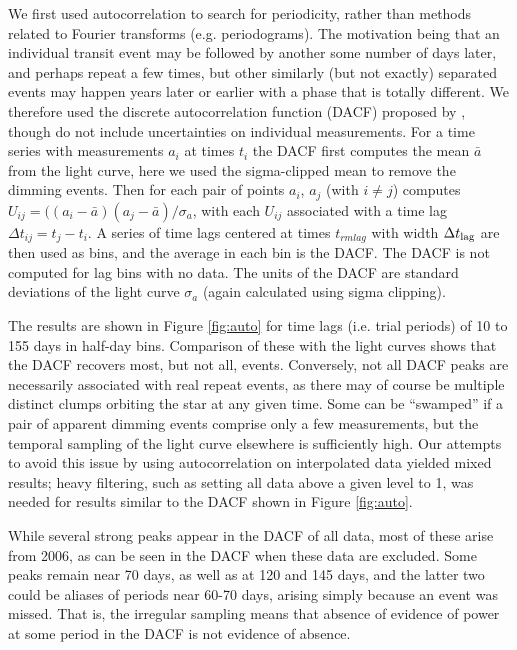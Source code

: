 \documentclass[useAMS,usenatbib,usegraphicx]{mn2e}
\begin{document}
We first used autocorrelation to search for periodicity, rather than methods related to
Fourier transforms (e.g. periodograms). The motivation being that an individual transit
event may be followed by another some number of days later, and perhaps repeat a few
times, but other similarly (but not exactly) separated events may happen years later or
earlier with a phase that is totally different. We therefore used the discrete
autocorrelation function (DACF) proposed by \citet{1988ApJ...333..646E}, though do not
include uncertainties on individual measurements. For a time series with measurements
$a_i$ at times $t_i$ the DACF first computes the mean $\bar{a}$ from the light curve,
here we used the sigma-clipped mean to remove the dimming events. Then for each pair of
points $a_i$, $a_j$ (with $i\ne j$) computes
$U_{ij}=((a_i-\bar{a})(a_j-\bar{a}) / \sigma_a$, with each $U_{ij}$ associated with a
time lag $\Delta t_{ij}=t_j - t_i$. A series of time lags centered at times $t_{rm lag}$
with width $\Delta t_{\rm lag}$ are then used as bins, and the average in each bin is the
DACF. The DACF is not computed for lag bins with no data. The units of the DACF are
standard deviations of the light curve $\sigma_a$ (again calculated using sigma
clipping).

The results are shown in Figure \ref{fig:auto} for time lags (i.e. trial periods) of 10
to 155 days in half-day bins. Comparison of these with the light curves shows that the
DACF recovers most, but not all, events. Conversely, not all DACF peaks are necessarily
associated with real repeat events, as there may of course be multiple distinct clumps
orbiting the star at any given time. Some can be ``swamped'' if a pair of apparent
dimming events comprise only a few measurements, but the temporal sampling of the light
curve elsewhere is sufficiently high. Our attempts to avoid this issue by using
autocorrelation on interpolated data yielded mixed results; heavy filtering, such as
setting all data above a given level to 1, was needed for results similar to the DACF
shown in Figure \ref{fig:auto}.

While several strong peaks appear in the DACF of all data, most of these arise from 2006,
as can be seen in the DACF when these data are excluded. Some peaks remain near 70 days,
as well as at 120 and 145 days, and the latter two could be aliases of periods near 60-70
days, arising simply because an event was missed. That is, the irregular sampling means
that absence of evidence of power at some period in the DACF is not evidence of absence.
\end{document}
